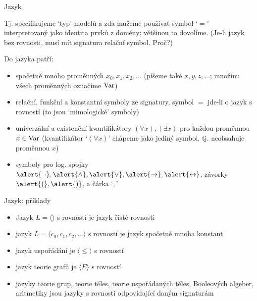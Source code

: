 \documentclass{beamer}
\begin{document}
\begin{frame}{Jazyk}


    Tj. specifikujeme `typ' modelů a zda můžeme používat symbol `\alert{$=$}' interpretovaný jako \alert{identita} prvků z domény; většinou to dovolíme.  \pause (Je-li jazyk bez  rovnosti, musí mít signatura relační symbol. Proč?) \pause 
    
    Do jazyka patří: \pause 
    \begin{itemize}
        \item spočetně mnoho \alert{proměnných} $x_0,x_1,x_2,\dots$ (píšeme také $x,y,z,\dots$; množinu všech proměnných označíme \alert{$\operatorname{Var}$}) \pause 
        \item \alert{relační}, \alert{funkční} a \alert{konstantní symboly} ze signatury, symbol \alert{$=$} jde-li o jazyk s rovností (to jsou `\alert{mimologické}' symboly) \pause 
        \item \alert{univerzální} a \alert{existenční} \alert{kvantifikátory} $(\forall x),(\exists x)$ pro každou proměnnou $x\in\operatorname{Var}$ \pause (kvantifikátor `$(\forall x)$' chápeme jako jediný symbol, tj. \alert{neobsahuje} proměnnou $x$) \pause 
        \item symboly pro log. spojky \( \alert{\neg},\alert{\landsymb},\alert{\lorsymb}, \alert{\limpliessymb}, \alert{\liffsymb} \), závorky \( \alert{(},\alert{)} \), a čárka `\alert{$,$}'
    \end{itemize}

\end{frame}


\begin{frame}{Jazyk: příklady}

    
    \begin{itemize}
        \item Jazyk \alert{$L=\langle\rangle$ s rovností} je jazyk \alert{čisté rovnosti} \pause 
        \item jazyk $L=\langle c_0,c_1,c_2,\dots\rangle$ s rovností je jazyk \alert{spočetně mnoha konstant} \pause 
        \item jazyk \alert{uspořádání} je $\langle \leq \rangle$ s rovností \pause 
        \item jazyk \alert{teorie grafů} je $\langle E \rangle$ s rovností \pause 
        \item jazyky \alert{teorie grup, teorie těles, teorie uspořádaných těles, Booleových algeber, aritmetiky} jsou jazyky \alert{s rovností} odpovídající daným signaturám
    \end{itemize}
    
\end{frame}
\end{document}
